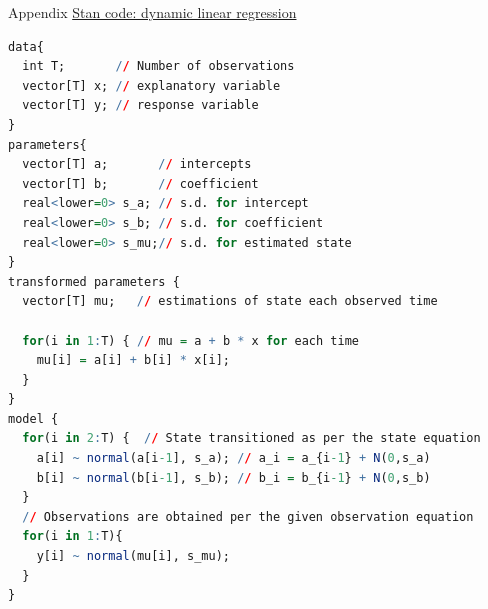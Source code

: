 \documentclass{beamer}
\begin{document}
\begin{frame}[fragile]{Appendix}
    \underline{Stan code: dynamic linear regression}
    \fontsize{6pt}{6pt}\selectfont
    \begin{lstlisting}[language=R]
data{
  int T;       // Number of observations
  vector[T] x; // explanatory variable
  vector[T] y; // response variable
}
parameters{
  vector[T] a;       // intercepts
  vector[T] b;       // coefficient
  real<lower=0> s_a; // s.d. for intercept
  real<lower=0> s_b; // s.d. for coefficient
  real<lower=0> s_mu;// s.d. for estimated state
}
transformed parameters {
  vector[T] mu;   // estimations of state each observed time
  
  for(i in 1:T) { // mu = a + b * x for each time
    mu[i] = a[i] + b[i] * x[i];
  }
}
model {
  for(i in 2:T) {  // State transitioned as per the state equation
    a[i] ~ normal(a[i-1], s_a); // a_i = a_{i-1} + N(0,s_a)
    b[i] ~ normal(b[i-1], s_b); // b_i = b_{i-1} + N(0,s_b)
  }
  // Observations are obtained per the given observation equation
  for(i in 1:T){
    y[i] ~ normal(mu[i], s_mu);
  }
}
    \end{lstlisting}
\end{frame}
\end{document}
